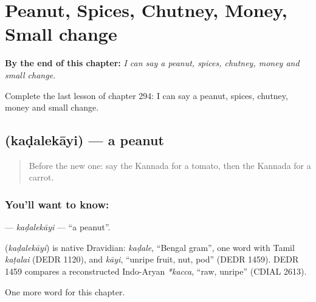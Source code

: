 
\chapter{Peanut, Spices, Chutney, Money, Small change}
\label{ch:ka-peanut-spices-chutney-money-small-change}

\begin{chapteropening}
\textbf{By the end of this chapter:} \emph{I can say a peanut, spices, chutney, money and small change.}

Complete the last lesson of chapter 294: I can say a peanut, spices, chutney, money and small change.
\end{chapteropening}

\section[\texorpdfstring{\kn{ಕಡಲೆಕಾಯಿ} (kaḍalekāyi)}{ಕಡಲೆಕಾಯಿ (kaḍalekāyi)}]{ (kaḍalekāyi) — a peanut}

\label{lesson:KA-C294-kadalekayi}



\begin{quote}
Before the new one: say the Kannada for a tomato, then the Kannada for a carrot.
\end{quote}

\subsection*{You'll want to know: }
\textbf{} — \emph{kaḍalekāyi} — \textquotedblleft{}a peanut\textquotedblright{}.

\begin{cousinweb}
\textbf{} (\emph{kaḍalekāyi}) is native Dravidian: \emph{kaḍale}, \textquotedblleft{}Bengal gram\textquotedblright{}, one word with Tamil \emph{kaṭalai} (DEDR 1120), and \emph{kāyi}, \textquotedblleft{}unripe fruit, nut, pod\textquotedblright{} (DEDR 1459). DEDR 1459 compares a reconstructed Indo-Aryan \emph{*kacca}, \textquotedblleft{}raw, unripe\textquotedblright{} (CDIAL 2613).
\end{cousinweb}

\begin{grammarlens}[title={What you've built}]
One more word for this chapter.
\end{grammarlens}

